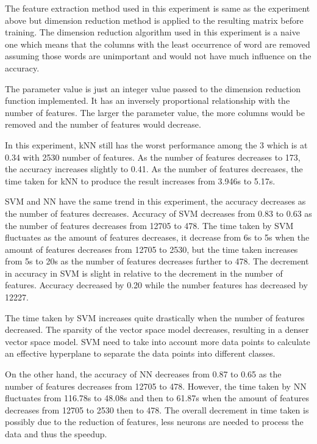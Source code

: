 The feature extraction method used in this experiment is same as the experiment above but dimension reduction method is applied to the resulting matrix before training. The dimension reduction algorithm used in this experiment is a naive one which means that the columns with the least occurrence of word are removed assuming those words are unimportant and would not have much influence on the accuracy.

The parameter value is just an integer value passed to the dimension reduction function implemented. It has an inversely proportional relationship with the number of features. The larger the parameter value, the more columns would be removed and the number of features would decrease.

In this experiment, kNN still has the worst performance among the 3 which is at 0.34 with 2530 number of features. As the number of features decreases to 173, the accuracy increases slightly to 0.41. As the number of features decreases, the time taken for kNN to produce the result increases from 3.946s to 5.17s.

SVM and NN have the same trend in this experiment, the accuracy decreases as the number of features decreases. Accuracy of SVM decreases from 0.83 to 0.63 as the number of features decreases from 12705 to 478. The time taken by SVM fluctuates as the amount of features decreases, it decrease from 6s to 5s when the amount of features decreases from 12705 to 2530, but the time taken increases from 5s to 20s as the number of features decreases further to 478. The decrement in accuracy in SVM is slight in relative to the decrement in the number of features. Accuracy decreased by 0.20 while the number features has decreased by 12227.

The time taken by SVM increases quite drastically when the number of features decreased. The sparsity of the vector space model decreases, resulting in a denser vector space model. SVM need to take into account more data points to calculate an effective hyperplane to separate the data points into different classes.

On the other hand, the accuracy of NN decreases from 0.87 to 0.65 as the number of features decreases from 12705 to 478. However, the time taken by NN fluctuates from 116.78s to 48.08s and then to 61.87s when the amount of features decreases from 12705 to 2530 then to 478. The overall decrement in time taken is possibly due to the reduction of features, less neurons are needed to process the data and thus the speedup.

